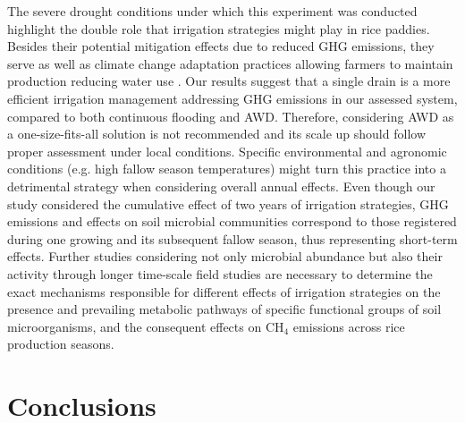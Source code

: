 The severe drought conditions under which this experiment was conducted highlight the double role that irrigation strategies might play in rice paddies. Besides their potential mitigation effects due to reduced GHG emissions, they serve as well as climate change adaptation practices allowing farmers to maintain production reducing water use \citep{ye2013}. Our results suggest that a single drain is a more efficient irrigation management addressing GHG emissions in our assessed system, compared to both continuous flooding and AWD. Therefore, considering AWD as a one-size-fits-all solution is not recommended and its scale up should follow proper assessment under local conditions. Specific environmental and agronomic conditions (e.g. high fallow season temperatures) might turn this practice into a detrimental strategy when considering overall annual effects. Even though our study considered the cumulative effect of two years of irrigation strategies, GHG emissions and effects on soil microbial communities correspond to those registered during one growing and its subsequent fallow season, thus representing short-term effects. Further studies considering not only microbial abundance but also their activity through longer time-scale field studies are necessary to determine the exact mechanisms responsible for different effects of irrigation strategies on the presence and prevailing metabolic pathways of specific functional groups of soil microorganisms, and the consequent effects on CH$_{4}$ emissions across rice production seasons.\\ 

\section{Conclusions}
\label{sec:conc}

